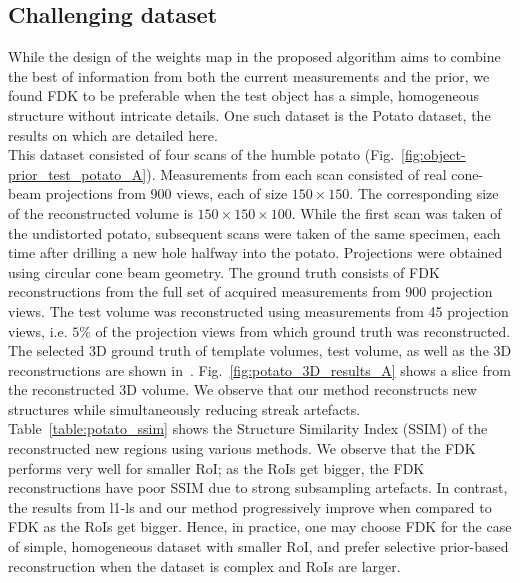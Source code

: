 \documentclass[journal]{IEEEtran}
\begin{document}

\subsection{\textbf{Challenging dataset}}
\label{Sec:potato}
While the design of the weights map in the proposed algorithm aims to combine the best of information from both the current measurements and the prior, we found FDK to be preferable when the test object has a simple, homogeneous structure without intricate details. One such dataset is the Potato dataset, the results on which are detailed here.\\
This dataset consisted of four scans of the humble potato (Fig.~\ref{fig:object-prior_test_potato_A}). Measurements from each scan consisted of real cone-beam projections from 900 views, each of size $150\times150$. The corresponding size of the reconstructed volume is $150\times150\times100$. While the first scan was taken of the undistorted potato, subsequent scans were taken of the same specimen, each time after drilling a new hole halfway into the potato.  Projections were obtained using circular cone beam geometry.  %
The ground truth consists of FDK reconstructions from the full set of acquired measurements from 900 projection views. The test volume was reconstructed using measurements from 45 projection views, i.e. $5\%$ of the projection views from which ground truth was reconstructed.  The selected 3D
ground truth of template volumes, test volume, as well as the 3D reconstructions are shown in~\cite{supp_paper}. Fig.~\ref{fig:potato_3D_results_A} shows a slice from the reconstructed 3D volume. We observe that our method reconstructs new structures while simultaneously reducing streak artefacts.\\ %
Table~\ref{table:potato_ssim} shows the Structure Similarity Index (SSIM) of the reconstructed new regions using various methods. We observe that the FDK performs very well for smaller RoI; as the RoIs get bigger, the FDK reconstructions have poor SSIM due to strong subsampling artefacts. In contrast, the results from l1-ls and our method progressively improve when compared to FDK as the RoIs get bigger. Hence, in practice, one may choose FDK for the case of simple, homogeneous dataset with smaller RoI,  and prefer selective prior-based reconstruction when the dataset is complex and RoIs are larger.
\end{document}
